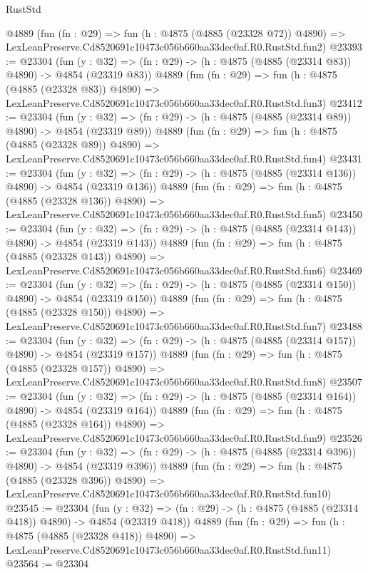 \begin{lexlean}{RustStd}
\begin{coremodule}
    @4889
    (fun (fn : @29) =>
    fun (h : @4875 (@4885 (@23328 @72)) @4890) =>
    LexLeanPreserve.Cd8520691c10473c056b660aa33dec0af.R0.RustStd.fun2)
@23393 := @23304
    (fun (y : @32) => (fn : @29) -> (h : @4875 (@4885 (@23314 @83)) @4890) -> @4854 (@23319 @83))
    @4889
    (fun (fn : @29) =>
    fun (h : @4875 (@4885 (@23328 @83)) @4890) =>
    LexLeanPreserve.Cd8520691c10473c056b660aa33dec0af.R0.RustStd.fun3)
@23412 := @23304
    (fun (y : @32) => (fn : @29) -> (h : @4875 (@4885 (@23314 @89)) @4890) -> @4854 (@23319 @89))
    @4889
    (fun (fn : @29) =>
    fun (h : @4875 (@4885 (@23328 @89)) @4890) =>
    LexLeanPreserve.Cd8520691c10473c056b660aa33dec0af.R0.RustStd.fun4)
@23431 := @23304
    (fun (y : @32) => (fn : @29) -> (h : @4875 (@4885 (@23314 @136)) @4890) -> @4854 (@23319 @136))
    @4889
    (fun (fn : @29) =>
    fun (h : @4875 (@4885 (@23328 @136)) @4890) =>
    LexLeanPreserve.Cd8520691c10473c056b660aa33dec0af.R0.RustStd.fun5)
@23450 := @23304
    (fun (y : @32) => (fn : @29) -> (h : @4875 (@4885 (@23314 @143)) @4890) -> @4854 (@23319 @143))
    @4889
    (fun (fn : @29) =>
    fun (h : @4875 (@4885 (@23328 @143)) @4890) =>
    LexLeanPreserve.Cd8520691c10473c056b660aa33dec0af.R0.RustStd.fun6)
@23469 := @23304
    (fun (y : @32) => (fn : @29) -> (h : @4875 (@4885 (@23314 @150)) @4890) -> @4854 (@23319 @150))
    @4889
    (fun (fn : @29) =>
    fun (h : @4875 (@4885 (@23328 @150)) @4890) =>
    LexLeanPreserve.Cd8520691c10473c056b660aa33dec0af.R0.RustStd.fun7)
@23488 := @23304
    (fun (y : @32) => (fn : @29) -> (h : @4875 (@4885 (@23314 @157)) @4890) -> @4854 (@23319 @157))
    @4889
    (fun (fn : @29) =>
    fun (h : @4875 (@4885 (@23328 @157)) @4890) =>
    LexLeanPreserve.Cd8520691c10473c056b660aa33dec0af.R0.RustStd.fun8)
@23507 := @23304
    (fun (y : @32) => (fn : @29) -> (h : @4875 (@4885 (@23314 @164)) @4890) -> @4854 (@23319 @164))
    @4889
    (fun (fn : @29) =>
    fun (h : @4875 (@4885 (@23328 @164)) @4890) =>
    LexLeanPreserve.Cd8520691c10473c056b660aa33dec0af.R0.RustStd.fun9)
@23526 := @23304
    (fun (y : @32) => (fn : @29) -> (h : @4875 (@4885 (@23314 @396)) @4890) -> @4854 (@23319 @396))
    @4889
    (fun (fn : @29) =>
    fun (h : @4875 (@4885 (@23328 @396)) @4890) =>
    LexLeanPreserve.Cd8520691c10473c056b660aa33dec0af.R0.RustStd.fun10)
@23545 := @23304
    (fun (y : @32) => (fn : @29) -> (h : @4875 (@4885 (@23314 @418)) @4890) -> @4854 (@23319 @418))
    @4889
    (fun (fn : @29) =>
    fun (h : @4875 (@4885 (@23328 @418)) @4890) =>
    LexLeanPreserve.Cd8520691c10473c056b660aa33dec0af.R0.RustStd.fun11)
@23564 := @23304

\end{coremodule}
\end{lexlean}
